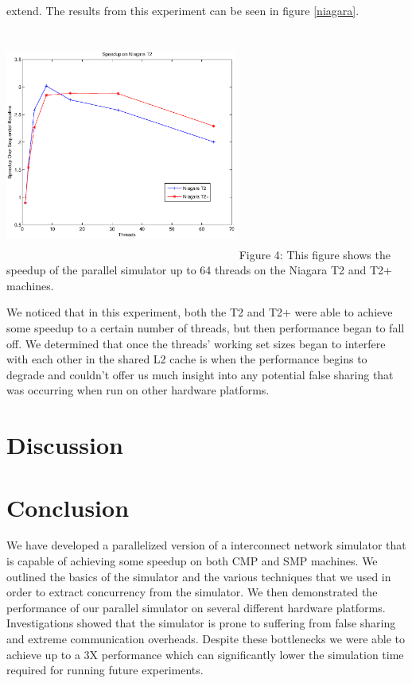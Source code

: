 \documentclass{article}
\begin{document}
\begin{multicols}{2}
extend.  The results from this experiment can be seen in figure
\ref{niagara}.
\begin{center}
\includegraphics[height=3in,width=3in]{niagara.eps}
\small{Figure 4: This figure shows the speedup of the parallel simulator
up to 64 threads on the Niagara T2 and T2+ machines.}
\end{center}
We noticed that in this experiment, both the T2 and T2+ were able to
achieve some speedup to a certain number of threads, but then performance
began to fall off.  We determined that once the threads' working set sizes
began to interfere with each other in the shared L2 cache is when the
performance begins to degrade and couldn't offer us much insight into  any potential false sharing that was occurring when run on other
hardware platforms.

\section{Discussion \label{disc}}


\section{Conclusion \label{conc}}
We have developed a parallelized version of a interconnect network
simulator that is capable of achieving some speedup on both CMP and SMP
machines.  We outlined the basics of the simulator and the various
techniques that we used in order to extract concurrency from the
simulator.  We then demonstrated the performance of our parallel simulator
on several different hardware platforms.  Investigations showed that the
simulator is prone to suffering from false sharing and extreme
communication overheads.  Despite these bottlenecks we were able to
achieve up to a 3X performance which can significantly lower the
simulation time required for running future experiments.






\end{multicols}
\end{document}
